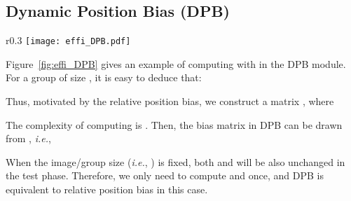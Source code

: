 \documentclass{article} \usepackage{iclr2022_conference,times}
\newcommand{\ie}{{\emph{i.e.}}}
\begin{document}
\subsection{Dynamic Position Bias (DPB)} \label{apd:dpb}



\begin{wrapfigure}[]{r}{0.3\linewidth}
    \vspace{-3mm}
    \texttt{[image: effi\_DPB.pdf]}
    \caption{An example of computing .}
    \label{fig:effi_DPB}
    \vspace{-3mm}
\end{wrapfigure}
Figure~\ref{fig:effi_DPB} gives an example of computing  with  in the DPB module. For a group of size , it is easy to deduce that:

Thus, motivated by the relative position bias, we construct a matrix , where

The complexity of computing  is . Then, the bias matrix  in DPB can be drawn from , \ie,

When the image/group size (\ie, ) is fixed, both  and  will be also unchanged in the test phase. Therefore, we only need to compute  and  once, and DPB is equivalent to relative position bias in this case.
\end{document}
